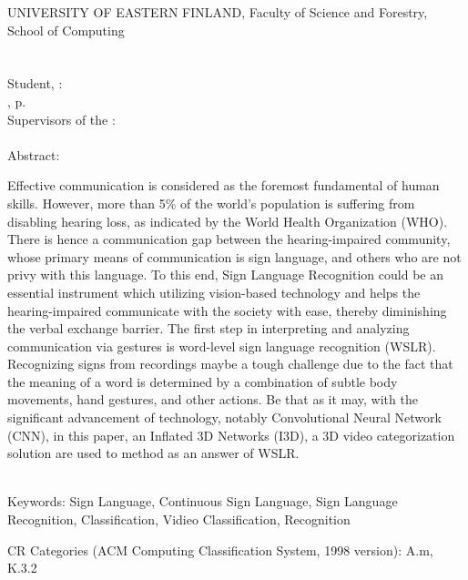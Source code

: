 \begin{spacing}{1.0}
\newpage


UNIVERSITY OF EASTERN FINLAND, Faculty of Science and Forestry, \campus School of Computing\\
\facultyschooleng \\ \\
Student, \authorname : \thesistitle \\
\documenttypeeng , \mypagecount p.\\
Supervisors of the \documenttypeeng : \supervisorseng \\
\ajankohtaenglish \\


Abstract:

Effective communication is considered as the foremost fundamental of human skills. However, more than 5\% of the world's population is suffering from disabling hearing loss, as indicated by the World Health Organization (WHO). There is hence a communication gap between the hearing-impaired community, whose primary means of communication is sign language, and others who are not privy with this language. To this end, Sign Language Recognition could be an essential instrument which utilizing vision-based technology and helps the hearing-impaired communicate with the society with ease, thereby diminishing the verbal exchange barrier. The first step in interpreting and analyzing communication via gestures is word-level sign language recognition (WSLR). Recognizing signs from recordings maybe a tough challenge due to the fact that the meaning of a word is determined by a combination of subtle body movements, hand gestures, and other actions. Be that as it may, with the significant advancement of technology, notably Convolutional Neural Network (CNN), in this paper, an Inflated 3D Networks (I3D), a 3D video categorization solution are used to method as an answer of WSLR.




~\\ %
Keywords:
Sign Language, Continuous Sign Language, Sign Language Recognition, Classification,
Vidieo Classification, Recognition




CR Categories (ACM Computing Classification System,
1998 version): A.m, K.3.2\\

\end{spacing}

